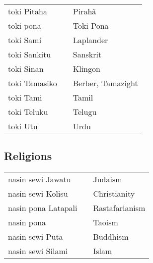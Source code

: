 \begin{supertabular}{p{4,5cm}|ll}
    toki Pitaha     &  & Pirahã                     \\
    toki pona       &  & Toki Pona                  \\
    toki Sami       &  & Laplander                  \\
    toki Sankitu    &  & Sanskrit                   \\
    toki Sinan      &  & Klingon                    \\
    toki Tamasiko   &  & Berber, Tamazight          \\
    toki Tami       &  & Tamil                      \\
    toki Teluku     &  & Telugu                     \\
    toki Utu        &  & Urdu                       \\
\end{supertabular}

\subsection*{Religions}

\begin{supertabular}{p{4,5cm}|ll}
    nasin sewi Jawatu   &  & Judaism        \\
    nasin sewi Kolisu   &  & Christianity   \\
    nasin pona Latapali &  & Rastafarianism \\
    nasin pona          &  & Taoism         \\
    nasin sewi Puta     &  & Buddhism       \\
    nasin sewi Silami   &  & Islam          \\
\end{supertabular}
